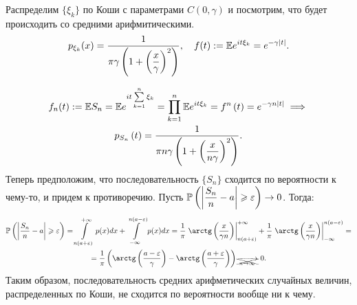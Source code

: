 \documentclass[../TV&MS.tex]{subfiles}
\begin{document}
\begin{Ex}
    Распределим $\{ \xi_k \}$ по Коши с параметрами $C(0, \gamma)$ и посмотрим, что будет происходить со средними арифмитическими.
    \[
        p_{\xi_k} (x) = \dfrac{1}{\pi \gamma \left( 1 + \left( \dfrac{x}{\gamma} \right) ^2 \right) }, \quad
        f(t) :=  \mathbb{E} e^{it\xi_k} = e^{-\gamma \left| t \right| }
    .\]

    \begin{multline*}
        f_n(t) := \mathbb{E} S_n = 
        \mathbb{E} e^{it \sum\limits_{k=1}^{n} \xi_k} = 
        \prod\limits_{k=1}^{n} \mathbb{E} e^{it\xi_k} = 
        f^{n} \left( t \right) =
        e^{-\gamma n \left| t \right| } \implies \\
        p_{S_n} \left( t \right) = \dfrac{1}{\pi n \gamma \left( 1 + \left( \dfrac{x}{n \gamma} \right)^2 \right) }
    .\end{multline*}
    Теперь предположим, что последовательность $\{ S_n \} $ сходится по вероятности к чему-то, и придем к противоречию.
    Пусть $\mathbb{P} \left( \left| \dfrac{S_n}{n} - a \right| \geqslant \varepsilon \right) \rightarrow 0$. Тогда:
    \begin{multline*}
        \Pro \left( \left| \dfrac{S_n}{n} - a \right| \geqslant \varepsilon \right) = \int\limits_{n(a+\varepsilon)}^{+\infty} p(x)dx + \int\limits_{-\infty}^{n(a - \varepsilon)} p(x)dx = 
        \dfrac{1}{\pi} \left. \arctg \left( \dfrac{x}{\gamma n} \right) \right|_{n(a+\varepsilon)}^{+\infty} + 
        \dfrac{1}{\pi} \left. \arctg \left( \dfrac{x}{\gamma n} \right) \right|_{-\infty}^{n(a - \varepsilon)} = \\
        = \dfrac{1}{\pi} \left( \arctg \left( \dfrac{a - \varepsilon}{\gamma} \right) - \arctg \left( \dfrac{a + \varepsilon}{\gamma} \right)  \right) 
        \xcancel{ \xrightarrow[n \rightarrow \infty]{}} \ 0
    .\end{multline*}
    Таким образом, последовательность средних арифметических случайных величин, распределенных по Коши, не сходится по вероятности вообще ни к чему.
\end{Ex} 

\newpage
\end{document}
